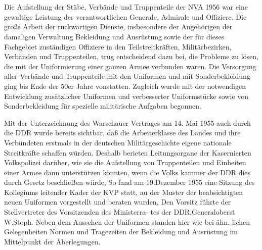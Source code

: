 \section{}

Die Aufstellung der Stäbe, Verbände und Truppenteile der NVA 1956 war eine gewaltige Leistung der verantwortlichen Generale, Admirale und Offiziere. Die große Arbeit der rückwärtigen Dienste, insbesondere der Angehörigen der damaligen Verwaltung Bekleidung und Ausrüstung sowie der für dieses Fachgebiet zuständigen Offiziere in den Teilstreitkräften, Militärbezirken, Verbänden und Truppenteilen, trug entscheidend dazu bei, die Probleme zu lösen, die mit der Uniformierung einer ganzen Armee verbunden waren. Die Versorgung aller Verbände und Truppenteile mit den Uniformen und mit Sonderbekleidung ging bis Ende der 50er Jahre vonstatten. Zugleich wurde mit der notwendigen Entwicklung zusätzlicher Uniformen und verbesserter Uniformstücke sowie von Sonderbekleidung für spezielle militärische Aufgaben begonnen.

Mit der Unterzeichnung des Warschauer Vertrages am 14. Mai 1955 auch durch die DDR wurde bereits sichtbar, daß die Arbeiterklasse des Landes und ihre Verbündeten erstmals in der deutschen Militärgeschichte eigene nationale Streitkräfte schaffen würden. Deshalb berieten Leitungsorgane der Kasernierten Volkspolizei darüber, wie sie die Aufstellung von Truppenteilen und Einheiten einer Armee dann unterstützen könnten, wenn die Volks
kammer der DDR dies durch Gesetz beschlieBen
wiirde, So fand am 19.Dezember 1955 eine Sitzung
des Kollegiums leitender Kader der KVP statt, au
der Muster der beabsichtigten neuen Uniformen
vorgestellt und beraten wurden, Den Vorsitz führte
der Stellvertreter des Vorsitzenden des Ministerra-
tes der DDR,Generaloberst W.Stoph. Neben dem
Aussehen der Uniformen standen hier wie bei ähn.
lichen Gelegenheiten Normen und Tragezeiten der
Bekleidung und Ausrüstung im Mittelpunkt der
Ãberlegungen.








